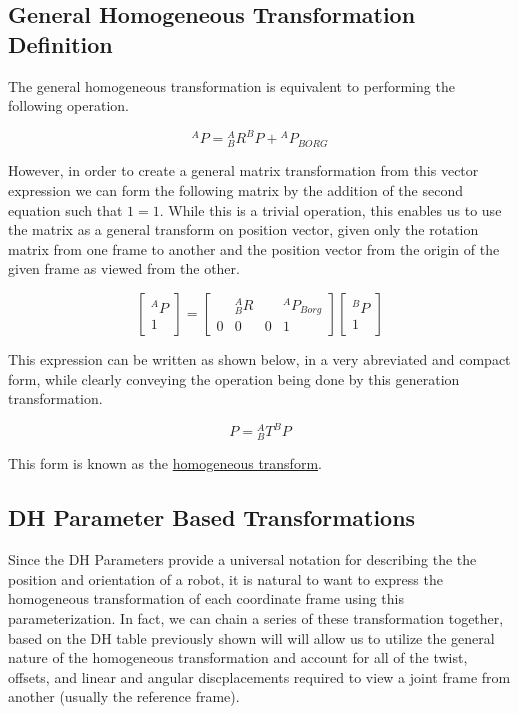 \subsection*{General Homogeneous Transformation Definition}

The general homogeneous transformation is equivalent to performing the following operation.

$$
{ }^{A} P={ }_{B}^{A} R^{B} P+{ }^{A} P_{B O R G}
$$

\noindent However, in order to create a general matrix transformation from this vector expression we can form the following matrix by the addition of the second equation such that $1 = 1$. While this is a trivial operation, this enables us to use the matrix as a general transform on position vector, given only the rotation matrix from one frame to another and the position vector from the origin of the given frame as viewed from the other.

$$
\left[\begin{array}{c}
{}^{A}P \\
1
\end{array}\right]=\left[\begin{array}{ccc|c}
{} & {}^{A}_{B}R & & {}^{A}P_{B org} \\
\hline 0 & 0 & 0 & 1
\end{array}\right]\left[\begin{array}{c}
{}^{B}P \\
1
\end{array}\right]
$$

\noindent This expression can be written as shown below, in a very abreviated and compact form, while clearly conveying the operation being done by this generation transformation.

$$
P={ }_{B}^{A} T^{B} P
$$

\noindent This form is known as the \underline{homogeneous transform}.

\subsection*{DH Parameter Based Transformations}

Since the DH Parameters provide a universal notation for describing the the position and orientation of a robot, it is natural to want to express the homogeneous transformation of each coordinate frame using this parameterization. In fact, we can chain a series of these transformation together, based on the DH table previously shown will will allow us to utilize the general nature of the homogeneous transformation and account for all of the twist, offsets, and linear and angular discplacements required to view a joint frame from another (usually the reference frame). \\

